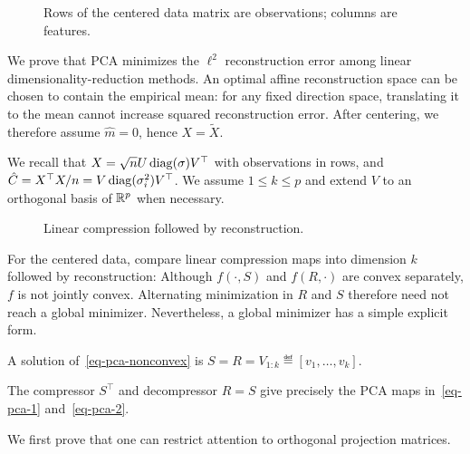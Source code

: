 \begin{figure}[tbp]
\centering
{}
\caption{Rows of the centered data matrix are observations; columns are features.}
\label{fig-review-ml-pca-data-matrix}
\end{figure}
We prove that PCA minimizes the $\ell^2$ reconstruction error among linear dimensionality-reduction methods.
%
An optimal affine reconstruction space can be chosen to contain the empirical mean: for any fixed direction space, translating it to the mean cannot increase squared reconstruction error. After centering, we therefore assume $\hat m=0$, hence $X=\tilde X$.

We recall that $X=\sqrt{n}U\operatorname{diag}(\sigma)V^\top$ with observations in rows, and $\hat C=X^\top X/n=V\operatorname{diag}(\sigma_i^2)V^\top$. We assume $1\leq k\leq p$ and extend $V$ to an orthogonal basis of $\mathbb{R}^p$ when necessary.

\begin{figure}[tbp]
\centering
{}
\caption{Linear compression followed by reconstruction.}
\label{fig-review-ml-pca-compression-reconstruction}
\end{figure}
For the centered data, compare linear compression maps into dimension $k$ followed by reconstruction:
Although $f(\cdot,S)$ and $f(R,\cdot)$ are convex separately, $f$ is not jointly convex. Alternating minimization in $R$ and $S$ therefore need not reach a global minimizer.
%
Nevertheless, a global minimizer has a simple explicit form.

\begin{thm}\label{thm-pca-optim}
	A solution of~\eqref{eq-pca-nonconvex} is $S=R=V_{1:k} \eqdef [v_1,\ldots,v_k]$.
\end{thm}

The compressor $S^\top$ and decompressor $R=S$ give precisely the PCA maps in~\eqref{eq-pca-1} and~\eqref{eq-pca-2}.

We first prove that one can restrict attention to orthogonal projection matrices.


